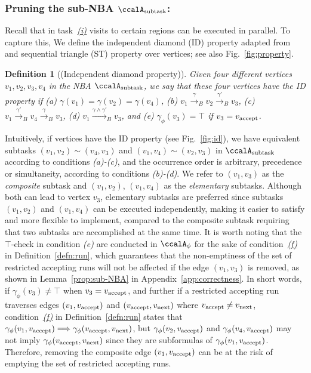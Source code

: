 \documentclass[Afour,sageh,times]{sagej}
\newtheorem{defn}[thm]{Definition}
\newcommand{\auto}[1]{\ccalA_{\textup{#1}}}
\newcommand{\autop}{\ccalA_{\phi}}
\newcommand{\vertex}[1]{v_{\textup{#1}}}
\newcommand{\simplies}{\DOTSB\Longrightarrow}
\begin{document}
  \subsubsection{Pruning the sub-NBA \upshape $\auto{subtask}$:} \label{sub-NBA:2}
Recall that in task~\hyperref[task:i]{\it (i)}  visits to  certain regions can be executed in parallel. To capture this, We define the independent diamond (ID) property adapted from~\cite{stefanescu2006automatic}  and sequential triangle (ST) property over vertices; see also Fig.~\ref{fig:property}.
\begin{defn}[(Independent diamond property)]\label{defn:id}
   Given four different vertices $v_1, v_2, v_3, v_4$ in the NBA $\auto{subtask}$, we say that these four vertices have the ID property if (a) $\gamma(v_1) = \gamma(v_2) = \gamma(v_4)$, (b) $v_1 \xrightarrow{\gamma}_B v_2 \xrightarrow{\gamma'}_B v_3$, (c) $v_1 \xrightarrow{\gamma'}_B v_4 \xrightarrow{\gamma}_B v_3$,  (d) $v_1 \xrightarrow{\gamma \wedge \gamma'}_B v_3$, and (e) $\gamma_{\phi}(v_3) = \top$ if $v_3 = \vertex{accept}$.
\end{defn}
Intuitively, if vertices have the ID property (see Fig.~\ref{fig:id}), we have equivalent subtasks $(v_1, v_2) \sim (v_4, v_3)$ and $(v_1, v_4) \sim (v_2, v_3)$ in $\auto{subtask}$ according to conditions {\it (a)-(c)}, and the occurrence order is arbitrary, precedence or simultaneity, according to conditions {\it (b)-(d)}.  We refer to $(v_1, v_3)$ as the {\it composite} subtask and $(v_1, v_2)$, $(v_1, v_4)$ as the {\it elementary} subtasks.  Although both can lead to vertex $v_3$, elementary subtasks are preferred since subtasks $(v_1, v_2)$ and $(v_1, v_4)$ can be executed independently, making it easier to satisfy and more flexible to implement, compared to the composite subtask requiring that two subtasks are accomplished at the same time. It is worth noting that the $\top$-check in condition {\it (e)} are conducted in $\autop$ for the sake of condition~\hyperref[cond:f]{\it (f)} in Definition~\ref{defn:run}, which guarantees  that the non-emptiness of the set of restricted accepting runs will not be affected if the edge $(v_1, v_3)$ is removed,  as shown in Lemma~\ref{prop:sub-NBA} in Appendix~\ref{app:correctness}. In short words, if $\gamma_{\phi}(v_3) \ne \top$ when $v_3 = \vertex{accept}$, and further if a restricted accepting run traverses edges $(v_1, \vertex{accept})$ and $(\vertex{accept}, \vertex{next})$ where $\vertex{accept}\neq \vertex{next}$, condition~\hyperref[cond:f]{\it (f)} in Definition~\ref{defn:run} states  that $\gamma_{\phi}(v_1, \vertex{accept}) \simplies \gamma_{\phi}(\vertex{accept}, \vertex{next})$, but $\gamma_{\phi}(v_2, \vertex{accept})$ and $\gamma_{\phi}(v_4, \vertex{accept})$ may not  imply $\gamma_{\phi}(\vertex{accept}, \vertex{next})$ since they are subformulas of $\gamma_{\phi}(v_1, \vertex{accept})$. Therefore, removing the composite edge $(v_1, \vertex{accept})$ can be at the risk of emptying the  set of restricted accepting runs.
\end{document}
